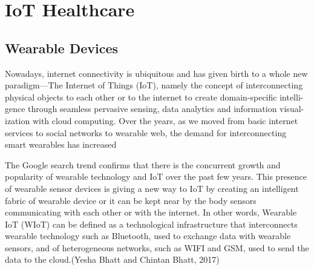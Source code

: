 
\chapter{IoT Healthcare} %

\label{IoT Healthcare} %

\section{Wearable Devices}
Nowadays, internet connectivity is ubiquitous and has given birth to a whole new
paradigm—The Internet of Things (IoT), namely the concept of interconnecting
physical objects to each other or to the internet to create domain-specific intelli-
gence through seamless pervasive sensing, data analytics and information visual-
ization with cloud computing. Over the years, as we moved from basic internet
services to social networks to wearable web, the demand for interconnecting smart
wearables has increased
\newline

The Google search trend confirms that there is the concurrent growth and
popularity of wearable technology and IoT over the past few years. This presence of
wearable sensor devices is giving a new way to IoT by creating an intelligent fabric
of wearable device or it can be kept near by the body sensors communicating with
each other or with the internet. In other words, Wearable IoT (WIoT) can be defined
as a technological infrastructure that interconnects wearable technology such as
Bluetooth, used to exchange data with wearable sensors, and of heterogeneous
networks, such as WIFI and GSM, used to send the data to the cloud.(Yesha Bhatt and Chintan Bhatt, 2017)

